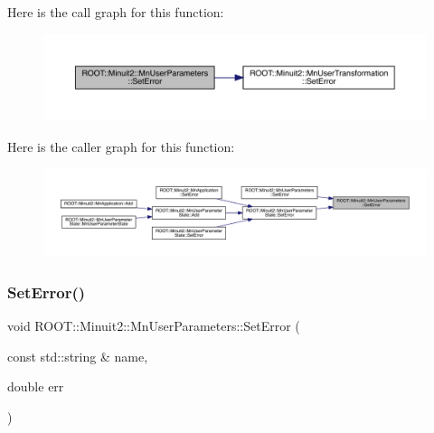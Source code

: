Here is the call graph for this function\+:
\nopagebreak
\begin{figure}[H]
\begin{center}
\leavevmode
\includegraphics[width=350pt]{d6/d10/classROOT_1_1Minuit2_1_1MnUserParameters_a64cbb6833d91d7f3bdef5b4dec9ae20f_cgraph}
\end{center}
\end{figure}
Here is the caller graph for this function\+:
\nopagebreak
\begin{figure}[H]
\begin{center}
\leavevmode
\includegraphics[width=350pt]{d6/d10/classROOT_1_1Minuit2_1_1MnUserParameters_a64cbb6833d91d7f3bdef5b4dec9ae20f_icgraph}
\end{center}
\end{figure}
\mbox{\label{classROOT_1_1Minuit2_1_1MnUserParameters_aa3d8a9df23458438ccff06800d7c9af2}} 
\subsubsection{\texorpdfstring{SetError()}{SetError()}\hspace{0.1cm}{\footnotesize\ttfamily [4/6]}}
{\footnotesize\ttfamily void R\+O\+O\+T\+::\+Minuit2\+::\+Mn\+User\+Parameters\+::\+Set\+Error (\begin{DoxyParamCaption}\item[{const std\+::string \&}]{name,  }\item[{double}]{err }\end{DoxyParamCaption})}

